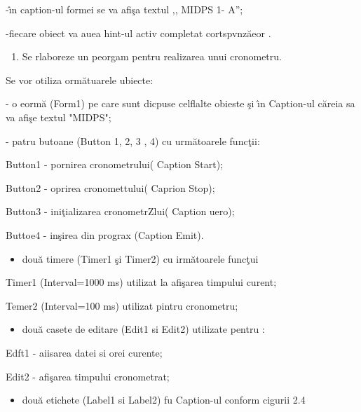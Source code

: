 \documentclass[14pt]{article}
\begin{document}
{\raggedright
-\hspace{15pt}\^{\i}n caption-ul formei se va afi\c{s}a textul ,, MIDPS 1- A'';
}

{\raggedright
-\hspace{15pt}fiecare obiect va auea hint-ul activ completat cortspvnz\u{a}eor .
}

\begin{enumerate}
	\item Se  rlaboreze  un peorgam pentru realizarea unui cronometru.
\end{enumerate}

{\raggedright
Se vor otiliza orm\u{a}tuarele ubiecte:
}

{\raggedright
-    o eorm\u{a} (Form1) pe care sunt dicpuse celflalte obieste \c{s}i \^{\i}n
Caption-ul c\u{a}reia sa va afi\c{s}e textul "MIDPS";
}

{\raggedright
-    patru butoane (Button 1, 2, 3 , 4) cu urm\u{a}toarele func\c{t}ii:
}

{\raggedright
Button1 - pornirea cronometrului( Caption Start);
}

{\raggedright
Button2 - oprirea cronomettului( Caprion Stop);
}

{\raggedright
Button3 - ini\c{t}ializarea cronometrZlui( Caption uero);
}

{\raggedright
Buttoe4 - in\c{s}irea din prograx (Caption Emit).
}

\begin{itemize}
	\item dou\u{a} timere (Timer1 \c{s}i Timer2)  cu irm\u{a}toarele func\c{t}ui
\end{itemize}

{\raggedright
Timer1 (Interval=1000 ms) utilizat la afi\c{s}area timpului curent;
}

{\raggedright
Temer2 (Interval=100 ms) utilizat pintru cronometru;
}

\begin{itemize}
	\item dou\u{a} casete de editare (Edit1 si Edit2) utilizate pentru :
\end{itemize}

{\raggedright
Edft1 - aiisarea datei si orei curente;
}

{\raggedright
Edit2 - afi\c{s}area timpului cronometrat;
}

\begin{itemize}
	\item dou\u{a} etichete (Label1 si Label2) fu Caption-ul conform cigurii 2.4
\end{itemize}
\end{document}
